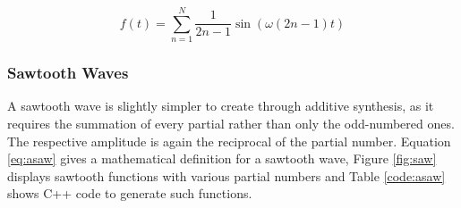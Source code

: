 \documentclass[12pt,twoside]{report}
\begin{document}
\begin{equation}
  f(t) = \sum\limits_{n=1}^N \frac{1}{2n -1} \sin(\omega (2n - 1) t)
  \label{eq:asquare}
\end{equation}

\begin{figure}

  \TopFloatBoxes

  \begin{floatrow}



  \end{floatrow}

\end{figure}

\pagebreak

\subsubsection{Sawtooth Waves}

A sawtooth wave is slightly simpler to create through additive synthesis, as it requires the summation of every partial rather than only the odd-numbered ones. The respective amplitude is again the reciprocal of the partial number. Equation \ref{eq:asaw} gives a mathematical definition for a sawtooth wave, Figure \ref{fig:saw} displays sawtooth functions with various partial numbers and Table \ref{code:asaw} shows C++ code to generate such functions.
\end{document}
